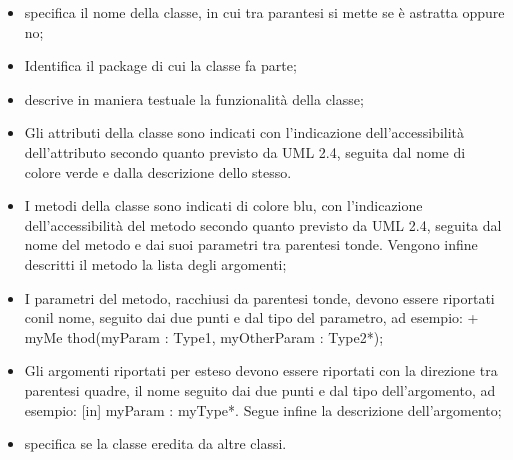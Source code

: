 \begin{itemize}
\item {}specifica il nome della classe, in cui tra parantesi si mette se è astratta oppure no;
\item {} Identifica il package di cui la classe fa parte;
\item {}descrive in maniera testuale la funzionalità della classe;
\item {}Gli attributi della classe sono indicati con l’indicazione dell’accessibilità dell’attributo secondo quanto previsto da UML 2.4, seguita dal nome di colore verde e dalla descrizione dello stesso.
\item {}I metodi della classe sono indicati di colore blu, con l’indicazione dell’accessibilità del metodo secondo quanto previsto da UML 2.4, seguita dal nome del metodo e  dai suoi parametri tra parentesi tonde.
Vengono infine descritti il metodo  la lista degli argomenti;
\item {} I parametri del metodo, racchiusi da parentesi tonde, devono essere riportati conil nome, seguito dai due punti e dal tipo del parametro, ad esempio: + myMe
thod(myParam : Type1, myOtherParam : Type2*);
\item {}Gli argomenti riportati per esteso devono essere riportati con la direzione tra
parentesi quadre, il nome seguito dai due punti e dal tipo dell’argomento, ad
esempio: [in] myParam : myType*. Segue infine la descrizione dell’argomento;

\item {}specifica se la classe eredita da altre classi.
\end{itemize}

